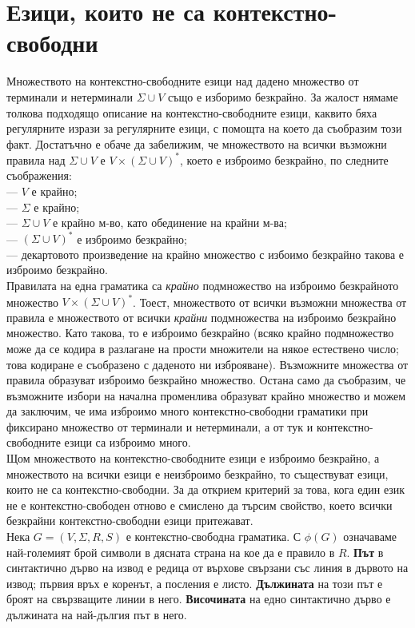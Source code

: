 \documentclass{article}
\begin{document}
\section{Езици, които не са контекстно-свободни} 
\hspace{15pt} Множеството на контекстно-свободните езици над дадено множество от 
терминали и нетерминали $\Sigma \cup V$ също е изборимо безкрайно.
За жалост нямаме толкова подходящо описание на контекстно-свободните езици, каквито 
бяха регулярните изрази за регулярните езици, с помощта на което да съобразим този факт. Достатъчно е
обаче да забелижим, че множеството на всички възможни правила над $\Sigma \cup V$ е 
$V \times (\Sigma \cup V)^*$, което е изброимо безкрайно, по следните съображения: \\
— $V$ е крайно; \\
— $\Sigma$ е крайно; \\
— $\Sigma \cup V$ е крайно м-во, като обединение на крайни м-ва; \\
— $(\Sigma \cup V)^*$ е изброимо безкрайно; \\
— декартовото произведение на крайно множество с избоимо безкрайно такова е изброимо безкрайно. \\
\hspace{15pt} Правилата на една граматика са \textit{крайно} подмножество на изброимо безкрайното множество 
$V \times (\Sigma \cup V)^*$. Тоест, множеството от всички възможни множества от правила
е множеството от всички \textit{крайни} подмножества на изброимо безкрайно множество. Като такова, 
то е изброимо безкрайно (всяко крайно подмножество може да се кодира в разлагане на 
прости множители на някое естествено число; това кодиране е съобразено с даденото ни
изброяване). Възможните множества от правила образуват изброимо безкрайно множество. 
Остана само да съобразим, че възможните избори на начална променлива образуват крайно
множество и можем да заключим, че има изброимо много контекстно-свободни граматики
при фиксирано множество от терминали и нетерминали, а от тук и контекстно-свободните
езици са изброимо много.\\
\hspace{15pt} Щом множеството на контекстно-свободните езици е изброимо безкрайно, а 
множеството на всички езици е неизброимо безкрайно, то съществуват езици, които не са 
контекстно-свободни. За да открием критерий за това, кога един език не е 
контекстно-свободен отново е смислено да търсим свойство, което всички безкрайни
контекстно-свободни езици притежават. \\
\hspace{15pt} Нека $G = (V,\Sigma,R,S)$ е контекстно-свободна граматика. С $\phi(G)$ означаваме 
най-големият брой символи в дясната страна на кое да е правило в $R$. \textbf{Път} 
в синтактично дърво на извод е редица от върхове свързани със линия в дървото на 
извод; първия връх е коренът, а посления е листо. \textbf{Дължината} на този път е
броят на свързващите линии в него. \textbf{Височината} на едно синтактично дърво е
дължината на най-дългия път в него. \\
\end{document}
